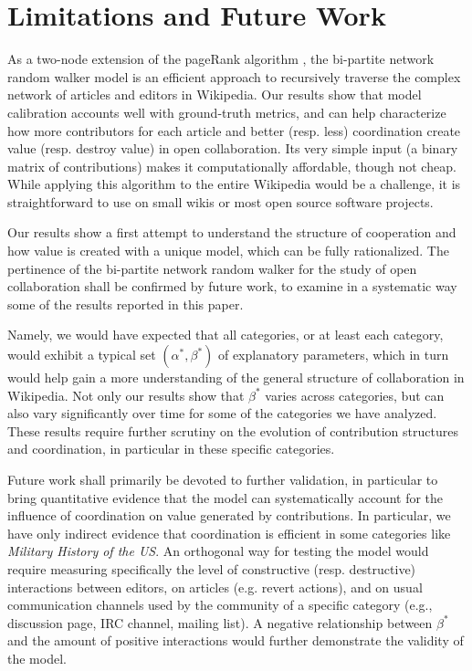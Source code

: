 \section{Limitations and Future Work}
As a two-node extension of the pageRank algorithm \cite{page1999pagerank,kleinberg1999}, the {bi-partite network random walker} model is an efficient approach to recursively traverse the complex network of articles and editors in Wikipedia. Our results show that model calibration accounts well with ground-truth metrics, and can help characterize how more contributors for each article and better (resp. less) coordination create value (resp. destroy value) in open collaboration. Its very simple input (a binary matrix of contributions) makes it computationally affordable, though not cheap. While applying this algorithm to the entire Wikipedia would be a challenge, it is straightforward to use on small wikis or most open source software projects.

Our results show a first attempt to understand the structure of cooperation and how value is created with a unique model, which can be fully rationalized. The pertinence of the {bi-partite network random walker} for the study of open collaboration shall be confirmed by future work,  to examine in a systematic way some of the results reported in this paper.

Namely, we would have expected that all categories, or at least each category, would exhibit a typical set $(\alpha^{*},\beta^{*})$ of explanatory parameters, which in turn would help gain a more understanding of the general structure of collaboration in Wikipedia. Not only our results show that $\beta^{*}$ varies across categories, but can also vary significantly over time for some of the categories we have analyzed. These results require further scrutiny on the evolution of contribution structures and coordination, in particular in these specific categories. 

Future work shall primarily be devoted to further validation, in particular to bring quantitative evidence that the model can systematically account for the influence of coordination on value generated by contributions. In particular, we have only indirect evidence that coordination is efficient in some categories like {\it Military History of the US}. An orthogonal way for testing the model would require measuring specifically the level of constructive (resp. destructive) interactions between editors, on articles (e.g. revert actions), and on usual communication channels used by the community of a specific category (e.g., discussion page, IRC channel, mailing list). A negative relationship between $\beta^{*}$ and the amount of positive interactions would further demonstrate the validity of the model.

